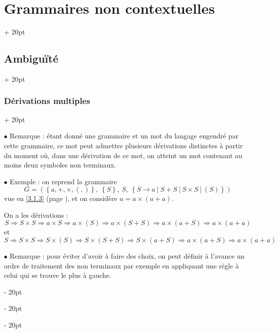 \documentclass[a4paper, 12pt, twoside]{article}
\newcommand{\lr}[1]{\left( #1 \right)}
\newcommand{\set}[1]{\left\{ #1 \right\}}
\newcommand{\ind}[1][20pt]{\advance\leftskip + #1}
\newcommand{\deind}[1][20pt]{\advance\leftskip - #1}
\newenvironment{indt}[2][20pt]{#2 \par \ind[#1]}{\par \deind} %
\begin{document}
\begin{indt}{\section{Grammaires non contextuelles}}
        \vspace{12pt}
        
        \begin{indt}{\subsection{Ambiguïté}}
            \begin{indt}{\subsubsection{Dérivations multiples}}
                \label{3.2.1}

                $\bullet$ Remarque : étant donné une grammaire et un mot du langage engendré par cette grammaire, ce mot peut admettre plusieurs dérivations distinctes à partir du moment où, dans une dérivation de ce mot, on atteint un mot contenant au moins deux symboles non terminaux.

                \vspace{12pt}
                
                $\bullet$  Exemple : on reprend la grammaire
                \[
                    G = \lr{\set{a, +, \times, (, )},\ \set{S},\ S,\ \set{S \rightarrow a \ |\ S + S \ |\ S \times S \ |\ (S)}}
                \]
                vue en \ref{3.1.3} (page \pageref{3.1.3}), et on considère $u = a \times (a + a)$.

                \vspace{6pt}
                
                On a les dérivations :
                \[
                    S \Rightarrow S \times S
                    \Rightarrow a \times S
                    \Rightarrow a \times (S)
                    \Rightarrow a \times (S + S)
                    \Rightarrow a \times (a + S)
                    \Rightarrow a \times (a + a)
                \]
                et
                \[
                    S
                    \Rightarrow S \times S
                    \Rightarrow S \times (S)
                    \Rightarrow S \times (S + S)
                    \Rightarrow S \times (a + S)
                    \Rightarrow a \times (a + S)
                    \Rightarrow a \times (a + a)
                \]

                \vspace{12pt}
                
                $\bullet$ Remarque : pour éviter d'avoir à faire des choix, on peut définir à l'avance un ordre de traitement des non terminaux par exemple en appliquant une règle à celui qui se trouve le plus à gauche.


\end{indt}
\end{indt}
\end{indt}
\end{document}
